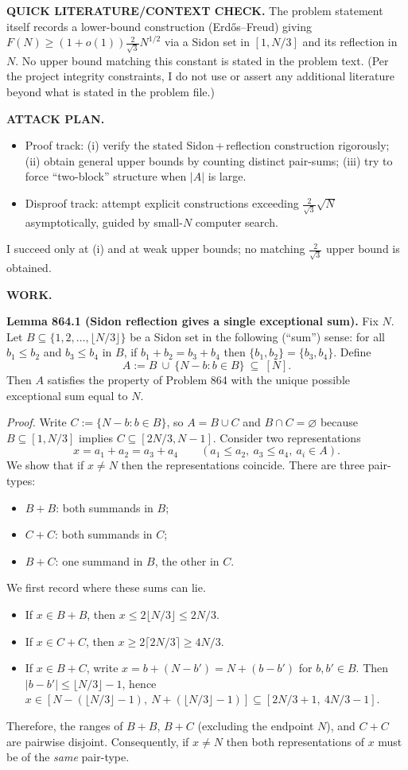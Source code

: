 \medskip
\noindent\textbf{QUICK LITERATURE/CONTEXT CHECK.}
The problem statement itself records a lower-bound construction (Erd\H{o}s--Freud) giving
$F(N)\ge (1+o(1))\tfrac{2}{\sqrt 3}N^{1/2}$ via a Sidon set in $[1,N/3]$ and its reflection in $N$.
No upper bound matching this constant is stated in the problem text.
(Per the project integrity constraints, I do not use or assert any additional literature beyond what is stated in the problem file.)

\medskip
\noindent\textbf{ATTACK PLAN.}
\begin{itemize}
\item Proof track: (i) verify the stated Sidon\,+\,reflection construction rigorously; (ii) obtain general upper bounds by counting distinct pair-sums; (iii) try to force ``two-block'' structure when $|A|$ is large.
\item Disproof track: attempt explicit constructions exceeding $\tfrac{2}{\sqrt 3}\sqrt N$ asymptotically, guided by small-$N$ computer search.
\end{itemize}
I succeed only at (i) and at weak upper bounds; no matching $\tfrac{2}{\sqrt 3}$ upper bound is obtained.

\medskip
\noindent\textbf{WORK.}

\medskip
\noindent\textbf{Lemma 864.1 (Sidon reflection gives a single exceptional sum).}
Fix $N$. Let $B\subseteq \{1,2,\dots,\lfloor N/3\rfloor\}$ be a Sidon set in the following (``sum'') sense:
for all $b_1\le b_2$ and $b_3\le b_4$ in $B$, if $b_1+b_2=b_3+b_4$ then $\{b_1,b_2\}=\{b_3,b_4\}$.
Define
\[
A:=B\ \cup\ \{N-b: b\in B\}\ \subseteq\ [N].
\]
Then $A$ satisfies the property of Problem 864 with the unique possible exceptional sum equal to $N$.

\smallskip
\noindent\emph{Proof.}
Write $C:=\{N-b:b\in B\}$, so $A=B\cup C$ and $B\cap C=\varnothing$ because $B\subseteq[1,N/3]$ implies $C\subseteq[2N/3,N-1]$.
Consider two representations
\[
x=a_1+a_2=a_3+a_4\qquad (a_1\le a_2,\ a_3\le a_4,\ a_i\in A).
\]
We show that if $x\ne N$ then the representations coincide.
There are three pair-types:
\begin{itemize}
\item[(1)] $B+B$: both summands in $B$;
\item[(2)] $C+C$: both summands in $C$;
\item[(3)] $B+C$: one summand in $B$, the other in $C$.
\end{itemize}
We first record where these sums can lie.
\begin{itemize}
\item If $x\in B+B$, then $x\le 2\lfloor N/3\rfloor\le 2N/3$.
\item If $x\in C+C$, then $x\ge 2\lceil 2N/3\rceil\ge 4N/3$.
\item If $x\in B+C$, write $x=b+(N-b')=N+(b-b')$ for $b,b'\in B$. Then $|b-b'|\le \lfloor N/3\rfloor-1$, hence
$x\in [N-(\lfloor N/3\rfloor-1),\ N+(\lfloor N/3\rfloor-1)]\subseteq [2N/3+1,\ 4N/3-1]$.
\end{itemize}
Therefore, the ranges of $B+B$, $B+C$ (excluding the endpoint $N$), and $C+C$ are pairwise disjoint.
Consequently, if $x\ne N$ then both representations of $x$ must be of the \emph{same} pair-type.

